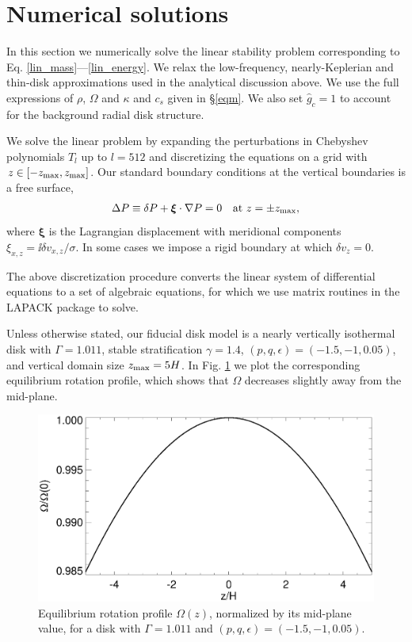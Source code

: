 \section{Numerical solutions}\label{numerical}
In this section we numerically solve the linear stability problem
corresponding to Eq. \ref{lin_mass}---\ref{lin_energy}. 
We relax the  low-frequency, nearly-Keplerian and thin-disk 
approximations used in the analytical discussion above. We 
use the full expressions of $\rho$, $\Omega$ and 
$\kappa$ and $c_s$ given in \S\ref{eqm}. We also set $\hat{g}_c=1$ to  
account for the background radial disk structure.  

We solve the linear problem by expanding the
perturbations in Chebyshev polynomials $T_l$ up to $l=512$
and discretizing the equations on a grid with
$z\in[-z_\mathrm{max},z_\mathrm{max}]$. Our standard boundary conditions at the vertical
boundaries is a free surface, 
\begin{align}
  \Delta P \equiv \delta P + \bm{\xi}\cdot\nabla P= 0 \quad \text{at } z=\pm z_\mathrm{max},
\end{align}
where $\bm{\xi}$ is the Lagrangian displacement with meridional 
components $\xi_{x,z} = \ii\delta v_{x,z}/\sigma$. In some cases we
impose a rigid boundary at which $\delta v_z=0$. 

The above discretization procedure
converts the linear system of differential equations to a set of 
algebraic equations, for which we use matrix routines in the LAPACK
package to solve. 

Unless otherwise stated, our fiducial disk model is a nearly 
vertically isothermal disk with $\Gamma=1.011$, stable
stratification $\gamma=1.4$, $(p,q,\epsilon)=(-1.5,-1,0.05)$, and 
vertical domain size $z_\mathrm{max}=5H$. In Fig. \ref{omega_z} we plot the
corresponding equilibrium rotation profile, which shows that $\Omega$
decreases slightly away from the mid-plane.  

\begin{figure}
  \includegraphics[width=\linewidth,clip=true,trim=0cm 0cm 0cm
  0cm]{figures/omega2} 
  \caption{Equilibrium rotation profile $\Omega(z)$,
    normalized by its mid-plane value, for a disk with $\Gamma=1.011$
    and $(p,q,\epsilon)=(-1.5,-1,0.05)$. 
    \label{omega_z} 
  }
\end{figure}

